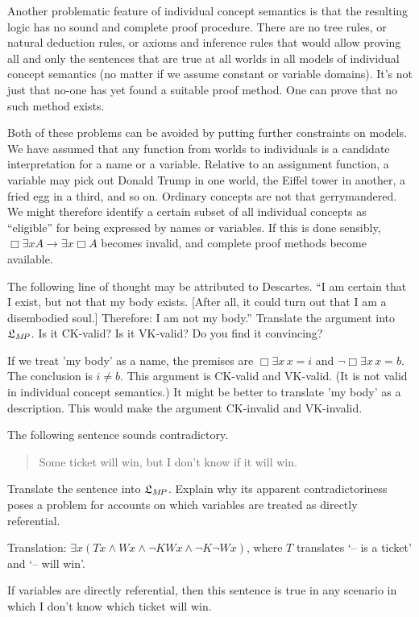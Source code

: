 Another problematic feature of individual concept semantics is that the
resulting logic has no sound and complete proof procedure. There are no tree
rules, or natural deduction rules, or axioms and inference rules that would
allow proving all and only the sentences that are true at all worlds in all
models of individual concept semantics (no matter if we assume constant or
variable domains). It's not just that no-one has yet found a suitable proof
method. One can prove that no such method exists.

Both of these problems can be avoided by putting further constraints on models.
We have assumed that any function from worlds to individuals is a candidate
interpretation for a name or a variable. Relative to an assignment function, a
variable may pick out Donald Trump in one world, the Eiffel tower in another, a
fried egg in a third, and so on. Ordinary concepts are not that gerrymandered.
We might therefore identify a certain subset of all individual concepts as
``eligible'' for being expressed by names or variables. If this is done
sensibly, $\Box \exists x A \to \exists x \Box A$ becomes invalid, and complete
proof methods become available.

\begin{exercise}
  The following line of thought may be attributed to Descartes. ``I am certain
  that I exist, but not that my body exists. [After all, it could turn out that
  I am a disembodied soul.] Therefore: I am not my body.'' Translate the
  argument into $\mathfrak{L}_{M\!P}$. Is it CK-valid? Is it VK-valid? Do you find it
  convincing?
\end{exercise}
\begin{solution}
  If we treat 'my body' as a name, the premises are $\Box \exists x\, x\!=\!i$ and
  $\neg\Box \exists x\, x\!=\!b$. The conclusion is $i\!\not=\!b$. This argument
  is CK-valid and VK-valid. (It is not valid in individual concept semantics.)
  It might be better to translate 'my body' as a description. This would make the argument CK-invalid and VK-invalid. 
\end{solution}

\begin{exercise}
  The following sentence sounds contradictory.
  \begin{quote}
    Some ticket will win, but I don't know if it will win.
  \end{quote}
  Translate the sentence into $\mathfrak{L}_{M\!P}$. Explain why its apparent
  contradictoriness poses a problem for accounts on which variables are treated
  as directly referential.
\end{exercise}
\begin{solution}
  Translation: $\exists x (Tx \land Wx \land \neg K Wx \land \neg K \neg Wx)$,
  where $T$ translates `-- is a ticket' and `-- will win'.

  If variables are directly referential, then this sentence is true in any
  scenario in which I don't know which ticket will win.
\end{solution}

